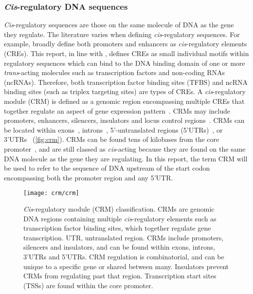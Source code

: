 \documentclass[../main.tex]{subfiles}
\begin{document}
\subsubsection{\texorpdfstring{\textit{Cis}-regulatory DNA sequences}{Cis\hyp{}regulatory DNA sequences}}\label{chapter1:cis-regulatory-dna-sequences}
\textit{Cis}\hyp{}regulatory sequences are those on the same molecule of DNA as the gene they regulate. The literature varies when defining \textit{cis}\hyp{}regulatory sequences. For example, \textcite*{wittkoppCisregulatoryElementsMolecular2012} broadly define both promoters and enhancers as \textit{cis}\hyp{}regulatory elements (CREs). This report, in line with \textcite*{swinnenLessonsDomesticationTargeting2016}, defines CREs as small individual motifs within regulatory sequences which can bind to the DNA binding domain of one or more \textit{trans}\hyp{}acting molecules such as transcription factors and non\hyp{}coding RNAs (ncRNAs). Therefore, both transcription factor binding sites (TFBS) and ncRNA binding sites (such as triplex targeting sites) are types of CREs.
A \textit{cis}\hyp{}regulatory module (CRM) is defined as a genomic region encompassing multiple CREs that together regulate an aspect of gene expression pattern~\autocite{guoNewAlgorithmIdentifying2017}. CRMs may include promoters, enhancers, silencers, insulators and locus control regions~\autocite{jeziorskaSystemsBiologyApproach2009}. CRMs can be located within exons~\autocite{tumpelRegulatoryModuleEmbedded2008}, introns~\autocite{ostrovskyIdentificationStrongIntron2018}, 5’\hyp{}untranslated regions (5’UTRs)~\autocite{bolleSegmentsEncodingUntranslated1994,henrySharedCisregulatoryModule2018}, or 3’UTRs~\autocite{palmerEnhancerControlsSnail2007,yochumGenomewideScreenBetacatenin2008} (\autoref{fig:crm}). CRMs can be found tens of kilobases from the core promoter~\autocite{bien-willnerSOX9cre1CisactingRegulatory2007,okaGenomewideMappingTranscriptional2017}, and are still classed as \textit{cis}\hyp{}acting because they are found on the same DNA molecule as the gene they are regulating. In this report, the term CRM will be used to refer to the sequence of DNA upstream of the start codon encompassing both the promoter region and any 5’UTR.

\begin{figure}[!ht]
  \begin{center}
    \capstart
    \texttt{[image: crm/crm]}
    \caption{\textit{Cis}\hyp{}regulatory module (CRM) classification. CRMs are genomic DNA
      regions containing multiple \textit{cis}\hyp{}regulatory elements such as
      transcription factor binding sites, which together regulate gene
      transcription. UTR, untranslated region. CRMs include promoters,
      silencers and insulators, and can be found within exons, introns, 3'UTRs
      and 5'UTRs. CRM regulation is combinatorial, and can be unique to a
      specific gene or shared between many. Insulators prevent CRMs from
      regulating past that region. Transcription start sites (TSSs) are found
      within the core promoter.
      \label{fig:crm}
    }
  \end{center}
\end{figure}
\end{document}

